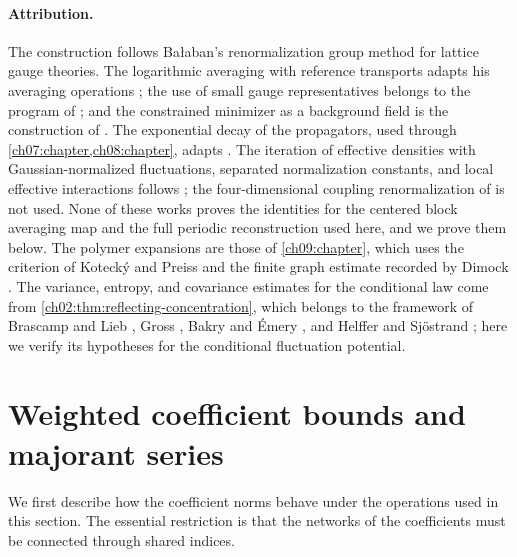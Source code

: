\paragraph{Attribution.}
The construction follows Bałaban's renormalization group method for lattice gauge theories. The logarithmic averaging with reference transports adapts his averaging operations \cite{Balaban1985Averaging}; the use of small gauge representatives belongs to the program of \cite{Balaban1985Regular}; and the constrained minimizer as a background field is the construction of \cite{Balaban1985Variational}. The exponential decay of the propagators, used through \cref{ch07:chapter,ch08:chapter}, adapts \cite{Balaban1984I,Balaban1984II,Balaban1985Background}. The iteration of effective densities with Gaussian-normalized fluctuations, separated normalization constants, and local effective interactions follows \cite{Balaban1985UV,Balaban1987RGI,Balaban1988RGII}; the four-dimensional coupling renormalization of \cite{Balaban1987RGI} is not used. None of these works proves the identities for the centered block averaging map and the full periodic reconstruction used here, and we prove them below. The polymer expansions are those of \cref{ch09:chapter}, which uses the criterion of Kotecký and Preiss \cite{KoteckyPreiss1986} and the finite graph estimate recorded by Dimock \cite[Appendix~B, Theorem~27, p.~39, and (323), p.~42]{Dimock2013v2}. The variance, entropy, and covariance estimates for the conditional law come from \cref{ch02:thm:reflecting-concentration}, which belongs to the framework of Brascamp and Lieb \cite{BrascampLieb1976}, Gross \cite{Gross1975}, Bakry and Émery \cite{BakryEmery1985}, and Helffer and Sjöstrand \cite{HelfferSjostrand1994,Helffer1998}; here we verify its hypotheses for the conditional fluctuation potential.

\section{Weighted coefficient bounds and majorant series}\label{ch10:sec:coefficients}

We first describe how the coefficient norms behave under the operations used in this section. The essential restriction is that the networks of the coefficients must be connected through shared indices.

